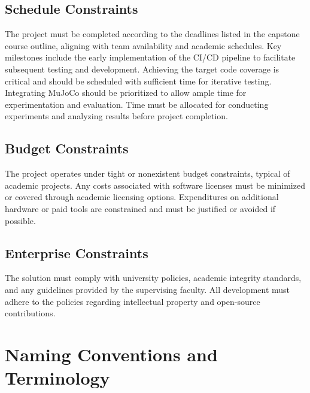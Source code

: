 \documentclass[12pt]{article}
\begin{document}
\subsection{Schedule Constraints}
The project must be completed according to the deadlines listed in the capstone course outline, aligning with team availability and academic schedules. Key milestones include the early implementation of the CI/CD pipeline to facilitate subsequent testing and development. Achieving the target code coverage is critical and should be scheduled with sufficient time for iterative testing. Integrating MuJoCo should be prioritized to allow ample time for experimentation and evaluation. Time must be allocated for conducting experiments and analyzing results before project completion.

\subsection{Budget Constraints}
The project operates under tight or nonexistent budget constraints, typical of academic projects. Any costs associated with software licenses must be minimized or covered through academic licensing options. Expenditures on additional hardware or paid tools are constrained and must be justified or avoided if possible.

\subsection{Enterprise Constraints}
The solution must comply with university policies, academic integrity standards, and any guidelines provided by the supervising faculty. All development must adhere to the policies regarding intellectual property and open-source contributions.

\section{Naming Conventions and Terminology}
\end{document}
